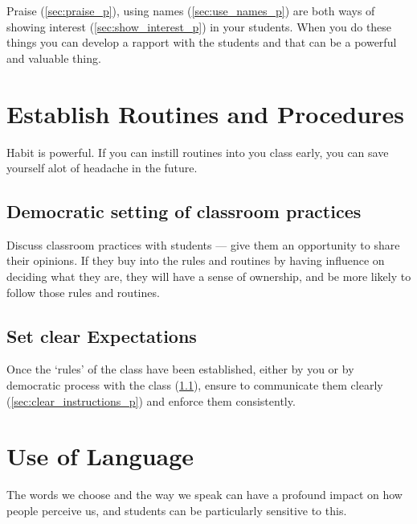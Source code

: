\documentclass[12pt]{report}
\begin{document}
Praise (\ref{sec:praise_p}), using names (\ref{sec:use_names_p}) are both ways of showing interest (\ref{sec:show_interest_p}) in your students. When you do these things you can develop a rapport with the students and that can be a powerful and valuable thing.



\section{Establish Routines and Procedures}
\label{sec:routines_p}

Habit is powerful. If you can instill routines into you class early, you can save yourself alot of headache in the future.

\subsection{Democratic setting of classroom practices}
\label{sec:democratic_setting_of_routines_p}

Discuss classroom practices with students --- give them an opportunity to share their opinions. If they buy into the rules and routines by having influence on deciding what they are, they will have a sense of ownership, and be more likely to follow those rules and routines.

\subsection{Set clear Expectations}
\label{sec:set_clear_expectations_p}

Once the `rules' of the class have been established, either by you or by democratic process with the class (\ref{sec:democratic_setting_of_routines_p}), ensure to communicate them clearly (\ref{sec:clear_instructions_p}) and enforce them consistently.



\section{Use of Language}
\label{sec:language_p}

The words we choose and the way we speak can have a profound impact on how people perceive us, and students can be particularly sensitive to this.
\end{document}
